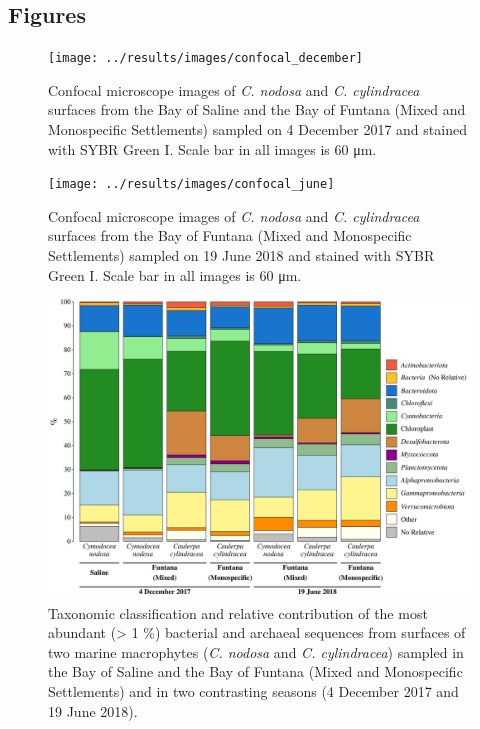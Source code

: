 \documentclass[
  12pt,
]{article}
\begin{document}
\newpage

\hypertarget{figures}{%
\subsection{Figures}\label{figures}}

\begin{figure}[ht]

{\centering \texttt{[image: ../results/images/confocal\_december]} 

}

\caption{Confocal microscope images of \textit{C. nodosa} and \textit{C. cylindracea} surfaces from the Bay of Saline and the Bay of Funtana (Mixed and Monospecific Settlements) sampled on 4 December 2017 and stained with SYBR Green I. Scale bar in all images is 60 \si{\um}.\label{confocal_december}}\label{fig:unnamed-chunk-1}
\end{figure}

\newpage
\begin{figure}[ht]

{\centering \texttt{[image: ../results/images/confocal\_june]} 

}

\caption{Confocal microscope images of \textit{C. nodosa} and \textit{C. cylindracea} surfaces from the Bay of Funtana (Mixed and Monospecific Settlements) sampled on 19 June 2018 and stained with SYBR Green I. Scale bar in all images is 60 \si{\um}.\label{confocal_june}}\label{fig:unnamed-chunk-2}
\end{figure}

\newpage
\begin{figure}[ht]

{\centering \includegraphics[width=1\linewidth]{../results/figures/community_bar_plot} 

}

\caption{Taxonomic classification and relative contribution of the most abundant (> 1 \si{\percent}) bacterial and archaeal sequences from surfaces of two marine macrophytes (\textit{C. nodosa} and \textit{C. cylindracea}) sampled in the Bay of Saline and the Bay of Funtana (Mixed and Monospecific Settlements) and in two contrasting seasons (4 December 2017 and 19 June 2018).\label{community}}\label{fig:unnamed-chunk-3}
\end{figure}
\end{document}
